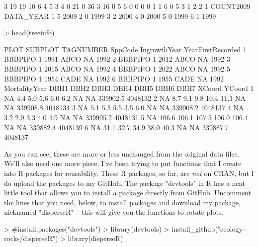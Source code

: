 \documentclass{article}
\begin{document}
\begin{Schunk}
\begin{Soutput}
3        19        19        10         6         4         5         3
4         0        21         0        36         3        16         0
5         6         0         0         0         0         1         1
6         0         5         3         1         2         2         1
  COUNT2009 DATA_YEAR
1         5      2009
2         0      1999
3         2      2000
4         0      2000
5         0      1999
6         1      1999
\end{Soutput}
\begin{Sinput}
> head(treeinfo)
\end{Sinput}
\begin{Soutput}
     PLOT SUBPLOT TAGNUMBER SppCode IngrowthYear YearFirstRecorded
1 BBBPIPO       1      1991    ABCO           NA              1992
2 BBBPIPO       1      2012    ABCO           NA              1992
3 BBBPIPO       1      2015    ABCO           NA              1992
4 BBBPIPO       1      2022    ABCO           NA              1992
5 BBBPIPO       1      1954    CADE           NA              1992
6 BBBPIPO       1      1955    CADE           NA              1992
  MortalityYear  DBH1  DBH2  DBH3  DBH4  DBH5 DBH6 DBH7   XCoord  YCoord
1            NA   4.4   5.0   5.6   6.0   6.2   NA   NA 339902.5 4048132
2            NA   8.7   9.1   9.8  10.4  11.1   NA   NA 339908.8 4048134
3            NA   5.1   5.5   5.5   3.5   6.0   NA   NA 339908.2 4048137
4            NA   3.2   2.9   3.3   4.0   4.9   NA   NA 339905.2 4048131
5            NA 106.6 106.1 107.5 106.0 106.4   NA   NA 339882.4 4048139
6            NA  31.1  32.7  34.9  38.0  40.3   NA   NA 339887.7 4048137
\end{Soutput}
\end{Schunk}

As you can see, these are more or less unchanged from the original data files. We'll also need one more piece. I've been trying to put functions that I create into R packages for reusability. These R packages, so far, are \textit{not} on CRAN, but I do upload the packages to my GitHub. The package "devtools" in R has a neat little tool that allows you to install a package directly from GitHub. Uncomment the lines that you need, below, to install packages and download my package, nicknamed "disperseR" -- this will give you the functions to rotate plots.

\begin{Schunk}
\begin{Sinput}
> #install.packages("devtools")
> library(devtools)
> install_github("ecology-rocks/disperseR")
> library(disperseR)
\end{Sinput}
\end{Schunk}
\end{document}
